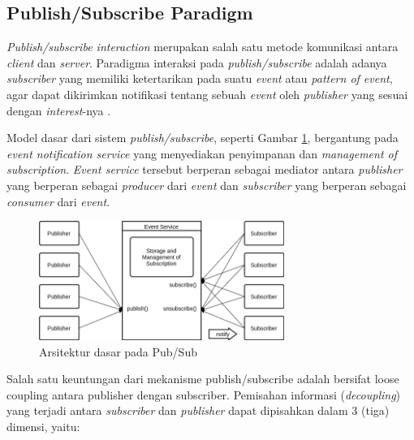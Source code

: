 \documentclass[conference]{IEEEtran}
\begin{document}
\subsection{Publish/Subscribe Paradigm}
\label{ssec:pub-sub}
\textit{Publish/subscribe interaction} merupakan salah satu metode komunikasi antara \textit{client} dan \textit{server}. Paradigma interaksi pada \textit{publish/subscribe} adalah adanya \textit{subscriber} yang memiliki ketertarikan pada suatu \textit{event} atau \textit{pattern of event}, agar dapat dikirimkan notifikasi tentang sebuah \textit{event} oleh \textit{publisher} yang sesuai dengan \textit{interest}-nya \cite{eugster_many_2003}.


Model dasar dari sistem \textit{publish/subscribe}, seperti Gambar \ref{fig:pub-sub-general}, bergantung pada \textit{event notification service} yang menyediakan penyimpanan dan \textit{management of subscription}. \textit{Event service} tersebut berperan sebagai mediator antara \textit{publisher} yang berperan sebagai \textit{producer} dari \textit{event} dan \textit{subscriber} yang berperan sebagai \textit{consumer} dari \textit{event}.


\begin{figure}[h]
	\centering
	\includegraphics[width=8cm]{Resources/Images/pub-sub-general}
	\caption{Arsitektur dasar pada Pub/Sub \cite{eugster_many_2003}}
	\label{fig:pub-sub-general}
\end{figure}


Salah satu keuntungan dari mekanisme publish/subscribe adalah bersifat loose coupling \cite{eugster_many_2003} antara publisher dengan subscriber. Pemisahan informasi (\textit{decoupling}) yang terjadi antara \textit{subscriber} dan \textit{publisher} dapat dipisahkan dalam 3 (tiga) dimensi, yaitu:
\end{document}
